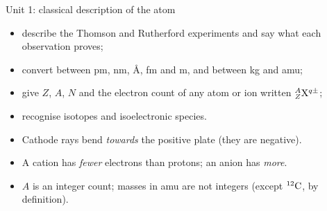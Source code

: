 \begin{recap}{Unit 1: classical description of the atom}
\begin{itemize}
  \item describe the Thomson and Rutherford experiments and say what each observation proves;
  \item convert between pm, nm, \AA{}, fm and m, and between kg and amu;
  \item give $Z$, $A$, $N$ and the electron count of any atom or ion written ${}^{A}_{Z}\mathrm{X}^{q\pm}$;
  \item recognise isotopes and isoelectronic species.
\end{itemize}

\begin{itemize}
  \item Cathode rays bend \emph{towards} the positive plate (they are negative).
  \item A cation has \emph{fewer} electrons than protons; an anion has \emph{more}.
  \item $A$ is an integer count; masses in amu are not integers (except ${}^{12}\mathrm{C}$, by definition).
\end{itemize}
\end{recap}
